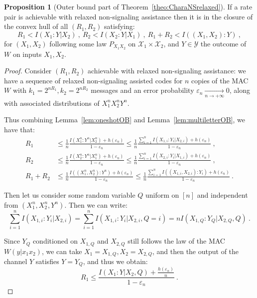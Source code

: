 \documentclass[11pt]{article}
\theoremstyle{definition}
\newtheorem{prop}[theo]{Proposition}
\theoremstyle{remark}
\begin{document}
      \begin{prop}[Outer bound part of Theorem~\ref{theo:CharaNSrelaxed}]
        \label{prop:OBNSrelaxed}
        If a rate pair is achievable with relaxed non-signaling assistance then it is in the closure of the convex hull of all $(R_1,R_2)$ satisfying:
        \[ R_1 < I(X_1:Y|X_2)\ ,\ R_2 < I(X_2:Y|X_1)\ ,\ R_1+R_2 < I((X_1,X_2):Y) \ ,\]
        for $(X_1,X_2)$ following some law $P_{X_1X_2}$ on $\mathcal{X}_1 \times \mathcal{X}_2$, and $Y \in \mathcal{Y}$ the outcome of $W$ on inputs $X_1,X_2$.
      \end{prop}
      \begin{proof}
        Consider $(R_1,R_2)$ achievable with relaxed non-signaling assistance: we have a sequence of relaxed non-signaling assisted codes for $n$ copies of the MAC $W$ with $k_1 = 2^{nR_1}, k_2 = 2^{nR_2}$ messages and an error probability $\varepsilon_n \underset{n \rightarrow +\infty}{\rightarrow} 0$, along with associated distributions of $X_1^nX_2^nY^n$.

    Thus combining Lemma~\ref{lem:oneshotOB} and Lemma~\ref{lem:multiletterOB}, we have that:
    \begin{equation}
      \begin{aligned}
        R_1 &\leq \frac{1}{n}\frac{I(X_1^n:Y^n|X_2^n)+h(\varepsilon_n)}{1-\varepsilon_n} \leq \frac{1}{n} \frac{\sum_{i=1}^nI(X_{1,i}:Y_i|X_{2,i})+h(\varepsilon_n)}{1-\varepsilon_n}\ ,\\
        R_2 &\leq \frac{1}{n}\frac{I(X_2^n:Y^n|X_1^n)+h(\varepsilon_n)}{1-\varepsilon_n} \leq \frac{1}{n}\frac{\sum_{i=1}^nI(X_{2,i}:Y_i|X_{1,i})+h(\varepsilon_n)}{1-\varepsilon_n} \ ,\\
        R_1+R_2 &\leq \frac{1}{n}\frac{I((X_1^n,X_2^n):Y^n)+h(\varepsilon_n)}{1-\varepsilon_n} \leq \frac{1}{n} \frac{\sum_{i=1}^nI((X_{1,i},X_{2,i}):Y_i)+h(\varepsilon_n)}{1-\varepsilon_n} \ .
      \end{aligned}
    \end{equation}

    Then let us consider some random variable $Q$ uniform on $[n]$ and independent from $(X_1^n,X_2^n,Y^n)$. Then we can write:
    \[ \sum_{i=1}^nI(X_{1,i}:Y_i|X_{2,i}) = \sum_{i=1}^nI(X_{1,i}:Y_i|X_{2,i},Q=i) = nI(X_{1,Q}:Y_Q|X_{2,Q},Q ) \ . \]

    Since $Y_Q$ conditioned on $X_{1,Q}$ and $X_{2,Q}$ still follows the law of the MAC $W(y|x_1x_2)$, we can take $X_1=X_{1,Q},X_2=X_{2,Q}$, and then the output of the channel $Y$ satisfies $Y=Y_Q$, and thus we obtain:
    \[ R_1 \leq \frac{I(X_1:Y|X_2,Q)+\frac{h(\varepsilon_n)}{n}}{1-\varepsilon_n} \ .\]
    

\end{proof}
\end{document}
